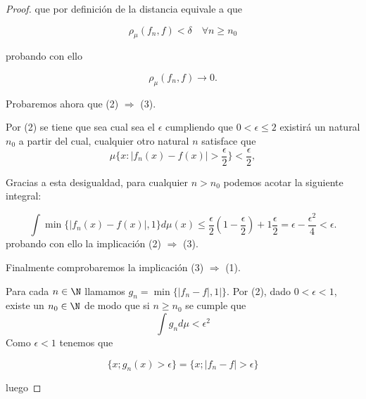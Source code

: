 \begin{proof}
    que por definición de la distancia equivale a que 

    \begin{equation}
        \rho_{\mu}(f_n, f) < \delta \quad \forall n \geq n_0
    \end{equation}

    probando con ello 

    \begin{equation}
        \rho_{\mu}(f_n, f) \longrightarrow 0. 
    \end{equation}

    Probaremos ahora que (2) $\Longrightarrow$ (3).   

    Por (2) se tiene que sea cual sea el $\epsilon$ cumpliendo que 
    $0 < \epsilon \leq 2$ 
    existirá un natural $n_0$ a partir del cual, cualquier otro natural $n$ 
    satisface que 
    \begin{equation} 
        \mu \{  
            x : |f_n(x) - f(x)| > \frac{\epsilon}{2}  
            \}  
        < 
        \frac{\epsilon}{2},  
    \end{equation}

    Gracias a esta desigualdad, para cualquier $n > n_0$ podemos acotar la siguiente integral: 

    \begin{equation}
        \int \min \{ |f_n(x) - f(x)|, 1\} d\mu(x) 
        \leq
        \frac{\epsilon}{2} (1-\frac{\epsilon}{2}) + 1\frac{\epsilon}{2} 
         = \epsilon - \frac{\epsilon^2}{4} <  \epsilon.  
    \end{equation}
    probando con ello la implicación (2) $\Longrightarrow$ (3).

    Finalmente comprobaremos la implicación (3) $\Longrightarrow$ (1).

    Para cada $n\in \N$ llamamos $g_n = \min\{|f_n - f|, 1|\}$.
    Por (2), dado $0 < \epsilon < 1$, existe un $n_0 \in \N$
    de modo que si $n \geq n_0$ se cumple que 
    \begin{equation}\label{eq:definicionesBasicasIntegralGNmenorEpsilonCuadrado}
        \int g_n d\mu < \epsilon^2
    \end{equation}
    Como $\epsilon < 1$ tenemos que 

    \begin{equation}
        \{ x; g_n(x) > \epsilon \}
         = 
         \{ x; |f_n - f| > \epsilon \}
    \end{equation}

    luego 


\end{proof}
